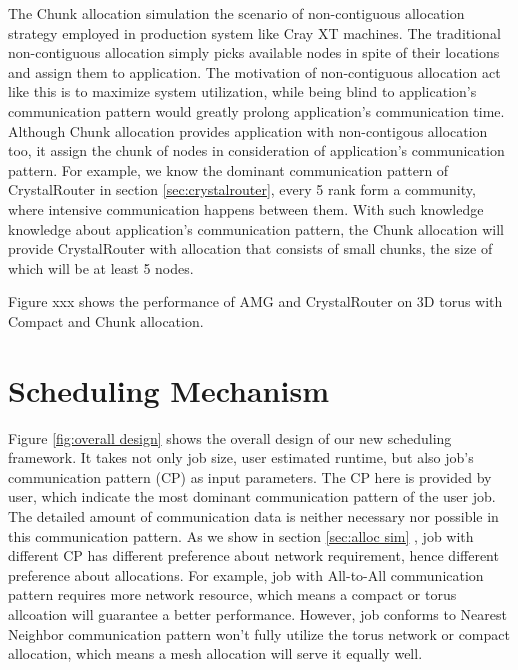 \documentclass[conference]{IEEEtran}
\begin{document}
The Chunk allocation simulation the scenario of non-contiguous allocation strategy employed in production system like Cray XT machines. The traditional non-contiguous allocation simply picks available nodes in spite of their locations and assign them to application. The motivation of non-contiguous allocation act like this is to maximize system utilization, while being blind to application's communication pattern would greatly prolong application's communication time. Although Chunk allocation provides application with non-contigous allocation too, it assign the chunk of nodes in consideration of application's communication pattern. For example, we know the dominant communication pattern of CrystalRouter in section \ref{sec:crystalrouter}, every 5 rank form a community, where intensive communication happens between them. With such knowledge knowledge about application's communication pattern, the Chunk allocation will provide CrystalRouter with allocation that consists of small chunks, the size of which will be at least 5 nodes. 

Figure xxx shows the performance of AMG and CrystalRouter on 3D torus with Compact and Chunk allocation. 






\iffalse

\section{Scheduling Mechanism}
\label{sec:scheduling mechanism}

Figure \ref{fig:overall design} shows the overall design of our new scheduling framework. It takes not only job size, user estimated runtime, but also job's communication pattern (CP) as input parameters. The CP here is provided by user, which indicate the most dominant communication pattern of the user job. The detailed amount of communication data is neither necessary nor possible in this communication pattern. As we show in section \ref{sec:alloc sim} , job with different CP has different preference about network requirement, hence different preference about allocations. For example, job with All-to-All communication pattern requires more network resource, which means a compact or torus allcoation will guarantee a better performance. However, job conforms to Nearest Neighbor communication pattern won't fully utilize the torus network or compact allocation, which means a mesh allocation will serve it equally well.
\end{document}
